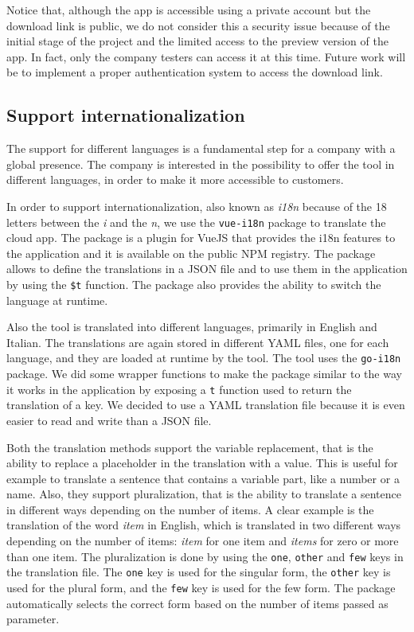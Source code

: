 Notice that, although the app is accessible using a private account but the download link is public, we do not consider this a security issue because of the initial stage of the project and the limited access to the preview version of the app. In fact, only the company testers can access it at this time. Future work will be to implement a proper authentication system to access the download link.

\subsection{Support internationalization}

The support for different languages is a fundamental step for a company with a global presence. The company is interested in the possibility to offer the tool in different languages, in order to make it more accessible to customers.

In order to support internationalization, also known as \textit{i18n} because of the 18 letters between the \textit{i} and the \textit{n}, we use the \texttt{vue-i18n} package to translate the cloud app. The package is a plugin for VueJS that provides the i18n features to the application and it is available on the public NPM registry. The package allows to define the translations in a JSON file and to use them in the application by using the \texttt{\$t} function. The package also provides the ability to switch the language at runtime.

Also the tool is translated into different languages, primarily in English and Italian. The translations are again stored in different YAML files, one for each language, and they are loaded at runtime by the tool. The tool uses the \texttt{go-i18n} package. We did some wrapper functions to make the package similar to the way it works in the application by exposing a \texttt{t} function used to return the translation of a key. We decided to use a YAML translation file because it is even easier to read and write than a JSON file.

Both the translation methods support the variable replacement, that is the ability to replace a placeholder in the translation with a value. This is useful for example to translate a sentence that contains a variable part, like a number or a name. Also, they support pluralization, that is the ability to translate a sentence in different ways depending on the number of items. A clear example is the translation of the word \textit{item} in English, which is translated in two different ways depending on the number of items: \textit{item} for one item and \textit{items} for zero or more than one item. The pluralization is done by using the \texttt{one}, \texttt{other} and \texttt{few} keys in the translation file. The \texttt{one} key is used for the singular form, the \texttt{other} key is used for the plural form, and the \texttt{few} key is used for the few form. The package automatically selects the correct form based on the number of items passed as parameter.

